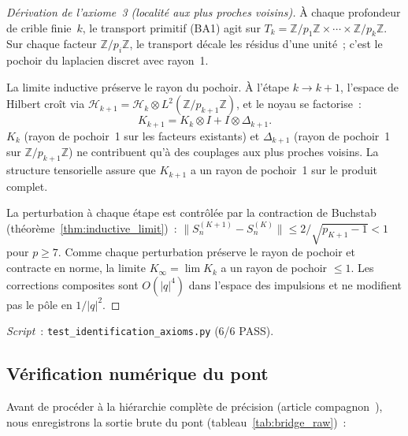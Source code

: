 \documentclass[12pt,a4paper]{article}
\begin{document}
\begin{proof}[Dérivation de l'axiome~3 (localité aux plus proches voisins)]
À chaque profondeur de crible finie~$k$, le transport primitif
(BA1) agit sur
$T_k = \mathbb{Z}/p_1\mathbb{Z} \times \cdots \times
\mathbb{Z}/p_k\mathbb{Z}$. Sur chaque facteur
$\mathbb{Z}/p_i\mathbb{Z}$, le transport décale les résidus
d'une unité~; c'est le pochoir du laplacien discret avec rayon~1.

La limite inductive préserve le rayon du pochoir. À l'étape
$k \to k+1$, l'espace de Hilbert croît via
$\mathcal{H}_{k+1} = \mathcal{H}_k \otimes
L^2(\mathbb{Z}/p_{k+1}\mathbb{Z})$, et le noyau se factorise~:
\begin{equation}
  K_{k+1} = K_k \otimes I + I \otimes \Delta_{k+1}.
  \label{eq:kernel_tensor}
\end{equation}
$K_k$ (rayon de pochoir~1 sur les facteurs existants) et
$\Delta_{k+1}$ (rayon de pochoir~1 sur
$\mathbb{Z}/p_{k+1}\mathbb{Z}$) ne contribuent qu'à des couplages
aux plus proches voisins. La structure tensorielle assure que
$K_{k+1}$ a un rayon de pochoir~1 sur le produit complet.

La perturbation à chaque étape est contrôlée par la contraction
de Buchstab (théorème~\ref{thm:inductive_limit})~:
$\|S_n^{(K+1)} - S_n^{(K)}\| \leq 2/\!\sqrt{p_{K+1}-1} < 1$ pour
$p \geq 7$. Comme chaque perturbation préserve le rayon de
pochoir et contracte en norme, la limite $K_\infty = \lim K_k$ a
un rayon de pochoir $\leq 1$. Les corrections composites sont
$O(|q|^4)$ dans l'espace des impulsions et ne modifient pas le
pôle en $1/|q|^2$.
\end{proof}

\noindent
\textit{Script}~: \texttt{test\_identification\_axioms.py} (6/6 PASS).

\subsection{Vérification numérique du pont}
\label{sec:ch9_numerical}

Avant de procéder à la hiérarchie complète de précision (article
compagnon~\cite{companion_physics}), nous enregistrons la sortie
brute du pont (tableau~\ref{tab:bridge_raw})~:
\end{document}
